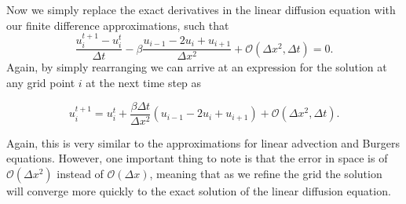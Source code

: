 Now we simply replace the exact derivatives in the linear diffusion equation with our finite difference approximations, such that
\begin{equation}
\frac{u_i^{t+1} - u_{i}^t}{\Delta t} - \beta \frac{u_{i-1} - 2u_i + u_{i+1}}{\Delta x^2} + \mathcal{O}(\Delta x^2,\Delta t) = 0.
\end{equation}
Again, by simply rearranging we can arrive at an expression for the solution at any grid point $i$ at the next time step as
\begin{eqBox}
\begin{equation}
u_i^{t+1}  = u_{i}^t + \frac{\beta \Delta t}{\Delta x^2} \left(u_{i-1} - 2u_i + u_{i+1}\right) + \mathcal{O}(\Delta x^2,\Delta t).
\label{eq:fd_diffusion}
\end{equation}
\end{eqBox}
Again, this is very similar to the approximations for linear advection and Burgers equations. However, one important thing to note is that the error in space is of $\mathcal{O}(\Delta x^2)$ instead of $\mathcal{O}(\Delta x)$, meaning that as we refine the grid the solution will converge more quickly to the exact solution of the linear diffusion equation.


